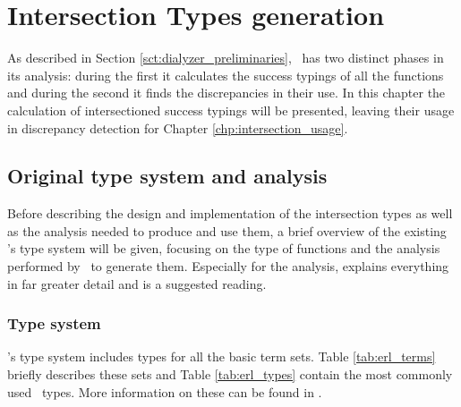 \chapter{Intersection Types generation}
\label{chp:intersection_generate}

As described in Section \ref{sct:dialyzer_preliminaries}, \dr\ has two
distinct phases in its analysis: during the first it calculates the
success typings of all the functions and during the second it finds
the discrepancies in their use. In this chapter the calculation of
intersectioned success typings will be presented, leaving their usage
in discrepancy detection for Chapter \ref{chp:intersection_usage}.

\section{Original type system and analysis}

Before describing the design and implementation of the intersection
types as well as the analysis needed to produce and use them, a brief
overview of the existing \er's type system will be given, focusing on
the type of functions and the analysis performed by \dr\ to generate
them. Especially for the analysis, \cite{Elli} explains everything in
far greater detail and is a suggested reading.

\subsection{Type system}

\er's type system includes types for all the basic term sets. Table
\ref{tab:erl_terms} briefly describes these sets and Table
\ref{tab:erl_types} contain the most commonly used \er\ types. More
information on these can be found in \cite{erlman, type_system, Manolis}.


